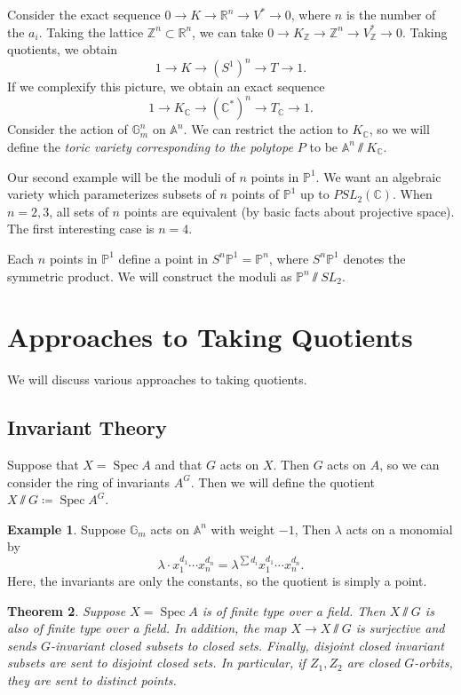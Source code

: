 \documentclass[leqno, openany]{memoir}
\newtheorem{thm}{Theorem}[section]
\theoremstyle{definition}
\newtheorem{exm}[thm]{Example}
\theoremstyle{remark}
\theoremstyle{plain}
\theoremstyle{definition}
\theoremstyle{remark}
\newcommand{\A}{\mathbb{A}}
\newcommand{\R}{\mathbb{R}}
\newcommand{\C}{\mathbb{C}}
\newcommand{\Z}{\mathbb{Z}}
\renewcommand{\P}{\mathbb{P}}
\DeclareMathOperator{\Spec}{Spec}
\begin{document}
Consider the exact sequence $0 \to K \to \R^n \to V^* \to 0$, where $n$ is the number of the $a_i$. Taking the lattice $\Z^n \subset \R^n$, we can take $0 \to K_{\Z} \to \Z^n \to V_{\Z}^* \to 0$. Taking quotients, we obtain
\[ 1 \to K \to (S^1)^n \to T \to 1. \]
If we complexify this picture, we obtain an exact sequence
\[ 1 \to K_{\C} \to (\C^*)^n \to T_{\C} \to 1. \]
Consider the action of $\mathbb{G}_m^n$ on $\A^n$. We can restrict the action to $K_{\C}$, so we will define the \textit{toric variety corresponding to the polytope $P$} to be $\A^n \sslash K_{\C}$. 

Our second example will be the moduli of $n$ points in $\P^1$. We want an algebraic variety which parameterizes subsets of $n$ points of $\P^1$ up to $PSL_2(\C)$. When $n = 2,3$, all sets of $n$ points are equivalent (by basic facts about projective space). The first interesting case is $n=4$.

Each $n$ points in $\P^1$ define a point in $S^n \P^1 = \P^n$, where $S^n \P^1$ denotes the symmetric product. We will construct the moduli as $\P^n \sslash SL_2$.

\section{Approaches to Taking Quotients}%
\label{sec:approaches_to_taking_quotients}

We will discuss various approaches to taking quotients.

\subsection{Invariant Theory}%
\label{sec:invariant_theory}

Suppose that $X = \Spec A$ and that $G$ acts on $X$. Then $G$ acts on $A$, so we can consider the ring of invariants $A^G$. Then we will define the quotient $X \sslash G \coloneqq \Spec A^G$. 

\begin{exm}
    Suppose $\mathbb{G}_m$ acts on $\A^n$ with weight $-1$, Then $\lambda$ acts on a monomial by 
    \[ \lambda \cdot x_1^{d_1} \cdots x_n^{d_n} = \lambda^{\sum d_i} x_1^{d_1} \cdots x_n^{d_n}. \]
    Here, the invariants are only the constants, so the quotient is simply a point.
\end{exm}

\begin{thm}
    Suppose $X = \Spec A$ is of finite type over a field. Then $X \sslash G$ is also of finite type over a field. In addition, the map $X \to X \sslash G$ is surjective and sends $G$-invariant closed subsets to closed sets. Finally, disjoint closed invariant subsets are sent to disjoint closed sets. In particular, if $Z_1,Z_2$ are closed $G$-orbits, they are sent to distinct points.
\end{thm}
\end{document}
